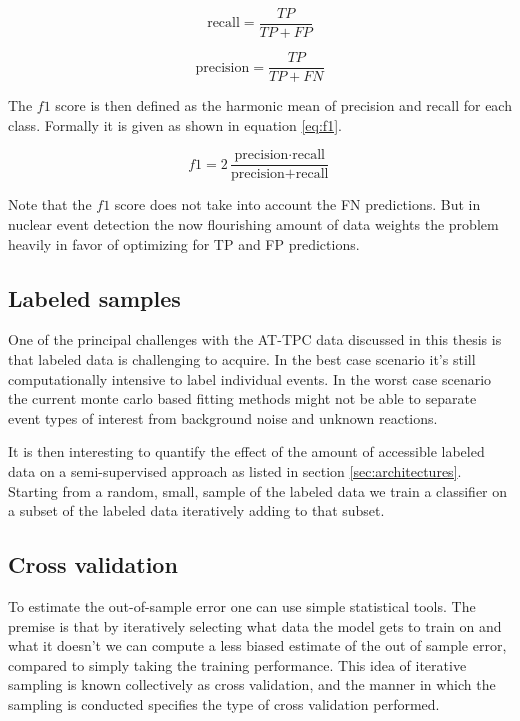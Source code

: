\begin{equation}\label{eq:recall}
\text{recall}= \frac{TP}{TP + FP}
\end{equation}

\begin{equation}\label{eq:precision}
\text{precision} = \frac{TP}{TP + FN}
\end{equation}

\noindent The $f1$ score is then defined as the harmonic mean of precision and recall for each class. Formally it is given as shown in equation \ref{eq:f1}.

\begin{equation}\label{eq:f1}
f1 = 2 \frac{\text{precision} \cdot \text{recall}}{\text{precision} + \text{recall}}
\end{equation}

\noindent Note that the $f1$ score does not take into account the FN predictions. But in nuclear event detection the now flourishing amount of data weights the problem heavily in favor of optimizing for TP and FP predictions. 

\subsection{Labeled samples}

One of the principal challenges with the AT-TPC data discussed in this thesis is that labeled data is challenging to acquire. In the best case scenario it's still computationally intensive to label individual events. In the worst case scenario the current monte carlo based fitting methods might not be able to separate event types of interest from background noise and unknown reactions.

It is then interesting to quantify the effect of the amount of accessible labeled data on a semi-supervised approach as listed in section \ref{sec:architectures}. Starting from a random, small, sample of the labeled data we train a classifier on a subset of the labeled data iteratively adding to that subset. 




\subsection{Cross validation}

To estimate the out-of-sample error one can use simple statistical tools. The premise is that by iteratively selecting what data the model gets to train on and what it doesn't we can compute a less biased estimate of the out of sample error, compared to simply taking the training performance. This idea of iterative sampling is known collectively as cross validation, and the manner in which the sampling is conducted specifies the type of cross validation performed. 